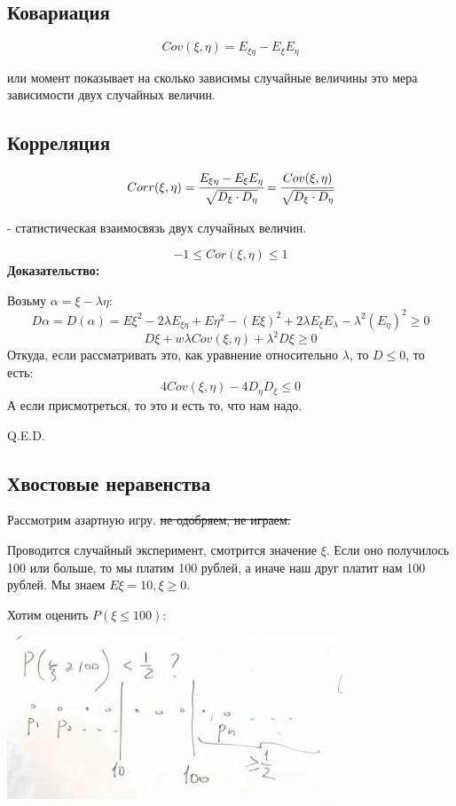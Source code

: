 \subsection{Ковариация}

$$Cov(\xi,\eta) =E_{\xi \eta} -  E_{\xi}E_{\eta}$$

 или  момент показывает на сколько зависимы случайные величины это мера зависимости двух случайных величин.

\subsection{Корреляция}

$$Corr(\xi,\eta) =\cfrac{E_{\xi \eta} -  E_{\xi}E_{\eta}}{\sqrt{D_{\xi}\cdot D_{\eta}}} = \cfrac{Cov(\xi,\eta)}{\sqrt{D_{\xi}\cdot D_{\eta}}}$$


 - статистическая взаимосвязь двух случайных величин.

$$-1\leq Cor(\xi,\eta)\leq 1$$
\textbf{Доказательство:}

Возьму $\alpha = \xi - \lambda \eta$:
$$D\alpha = D(\alpha) = E\xi^2 - 2\lambda E_{\xi\eta} + E \eta^2-(E\xi)^2 + 2\lambda E_{\xi}E_{\lambda}-\lambda^2(E_\eta)^2\geq 0$$
$$D\xi + w\lambda Cov(\xi,\eta) + \lambda^2 D\xi \geq 0$$
Откуда, если рассматривать это, как уравнение относительно $\lambda$, то $D\leq 0 $, то есть:
$$4Cov(\xi,\eta) - 4 D_{\eta}D_{\xi}\leq 0$$
А если присмотреться, то это и есть то, что нам надо.

\hfill Q.E.D.

\subsection{Хвостовые неравенства}

Рассмотрим азартную игру. \sout{не одобряем, не играем.} 

Проводится случайный эксперимент, смотрится значение $\xi$. Если оно получилось 100 или больше, то мы платим 100 рублей, а иначе наш друг платит нам 100 рублей. Мы знаем $ E\xi = 10, \xi\geq 0$.

Хотим оценить $P(\xi\leq 100)$:
\begin{center}
    \includegraphics[width = 10cm]{assets/3_3_1.jpg}
\end{center}

